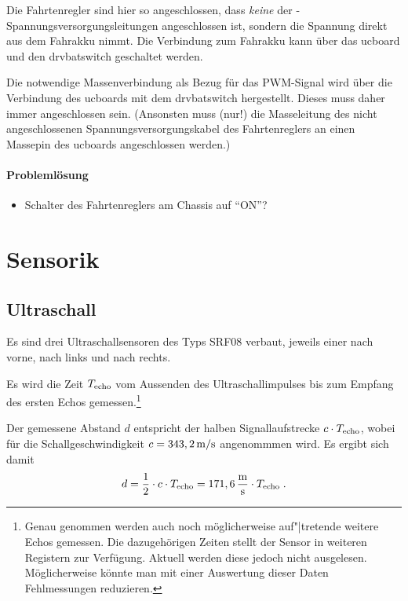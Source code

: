 Die Fahrtenregler sind hier so angeschlossen, dass \emph{keine} der -Spannungsversorgungsleitungen angeschlossen ist, sondern die Spannung direkt aus dem Fahrakku nimmt. Die Verbindung zum Fahrakku kann über das ucboard und den drvbatswitch geschaltet werden.



Die notwendige Massenverbindung als Bezug für das PWM-Signal wird über die Verbindung des ucboards mit dem drvbatswitch hergestellt. Dieses muss daher immer angeschlossen sein. (Ansonsten muss (nur!) die Masseleitung des nicht angeschlossenen Spannungsversorgungskabel des Fahrtenreglers an einen Massepin des ucboards angeschlossen werden.) 



\paragraph{Problemlösung}

\begin{itemize}
	\item Schalter des Fahrtenreglers am Chassis auf "`ON"'?
\end{itemize}



\section{Sensorik}

\subsection{Ultraschall}

Es sind drei Ultraschallsensoren des Typs SRF08 verbaut, jeweils einer nach vorne, nach links und nach rechts.

Es wird die Zeit $T_{\mathrm{echo}}$ vom Aussenden des Ultraschallimpulses bis zum Empfang des ersten Echos gemessen.\footnote{Genau genommen werden auch noch möglicherweise auf"|tretende weitere Echos gemessen. Die dazugehörigen Zeiten stellt der Sensor in weiteren Registern zur Verfügung. Aktuell werden diese jedoch nicht ausgelesen. Möglicherweise könnte man mit einer Auswertung dieser Daten Fehlmessungen reduzieren.}

Der gemessene Abstand $d$ entspricht der halben Signallaufstrecke $c \cdot T_{\mathrm{echo}}$, wobei für die Schallgeschwindigkeit $c = 343,2\,\mathrm{m/s}$ angenommmen wird. Es ergibt sich damit
\begin{align*}
	d = \frac{1}{2} \cdot c \cdot T_{\mathrm{echo}} = 171,6\,\mathrm{\frac{m}{s}} \cdot T_{\mathrm{echo}}\;.
\end{align*}


